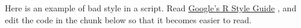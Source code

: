 \begin{playground}
Here is an example of bad style in a script. Read \href{https://google.github.io/styleguide/Rguide.xml}{Google's R Style Guide}%
, and edit the code in the chunk below so that it becomes easier to read.











































































































\end{playground}
